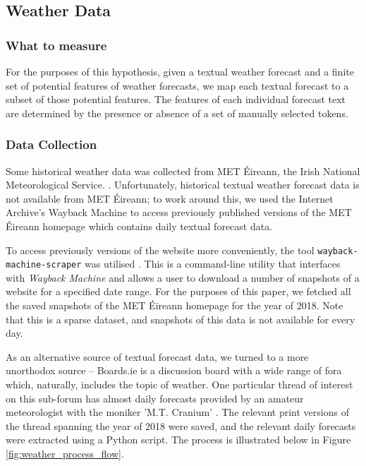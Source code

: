 \documentclass[a4paper,10pt]{article}
\begin{document}
    \subsection{Weather Data}

    \subsubsection{What to measure}

    For the purposes of this hypothesis, given a textual weather forecast and a finite set of potential features of weather forecasts, we map each textual forecast to a subset of those potential features. The features of each individual forecast text are determined by the presence or absence of a set of manually selected tokens.

    \subsubsection{Data Collection}

    Some historical weather data was collected from MET \'{E}ireann, the Irish National Meteorological Service. . Unfortunately, historical textual weather forecast data is not available from MET \'{E}ireann; to work around this, we used the Internet Archive's Wayback Machine  to access previously published versions of the MET \'{E}ireann homepage which contains daily textual forecast data.

    To access previously versions of the website more conveniently, the tool \texttt{wayback-machine-scraper} was utilised . This is a command-line utility that interfaces with \textit{Wayback Machine} and allows a user to download a number of snapshots of a website for a specified date range. For the purposes of this paper, we fetched all the saved snapshots of the MET \'{E}ireann homepage for the year of 2018. Note that this is a sparse dataset, and snapshots of this data is not available for every day.

    As an alternative source of textual forecast data, we turned to a more unorthodox source -- Boards.ie is a discussion board with a wide range of fora which, naturally, includes the topic of weather. One particular thread of interest on this sub-forum has almost daily forecasts provided by an amateur meteorologist with the moniker 'M.T. Cranium' . The relevant print versions of the thread spanning the year of 2018 were saved, and the relevant daily forecasts were extracted using a Python script. The process is illustrated below in Figure \ref{fig:weather_process_flow}.
\end{document}
